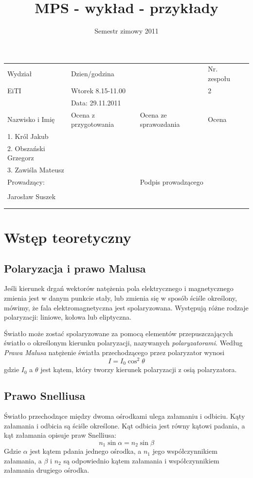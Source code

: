 \documentclass[10pt,a4paper]{article}
\begin{document}
\title{MPS - wykład - przykłady}
\date{Semestr zimowy 2011}
\begin{tabular}{|l|l|l|l|l|}
\hline
Wydział & \multicolumn{2}{l|}{Dzien/godzina}& Nr. zespołu\\
EiTI & \multicolumn{2}{l|}{Wtorek 8.15-11.00}& 2\\
\cline{2-3}
& \multicolumn{2}{l|}{Data: 29.11.2011}& \\
\hline
Nazwisko i Imię & Ocena z przygotowania & Ocena ze sprawozdania & Ocena\\
\hline
1. Król Jakub & & & \\
2. Obszański Grzegorz & & & \\
3. Zawiśla Mateusz & & & \\
\hline
\multicolumn{2}{|l|}{Prowadzący:} & \multicolumn{2}{l|}{Podpis prowadzącego}\\
\multicolumn{2}{|l|}{} & \multicolumn{2}{l|}{}\\
\multicolumn{2}{|l|}{Jarosław Suszek} & \multicolumn{2}{l|}{}\\
\multicolumn{2}{|l|}{} & \multicolumn{2}{l|}{}\\
\multicolumn{2}{|l|}{} & \multicolumn{2}{l|}{}\\\hline
 \end{tabular}
 \vspace{3cm}
\section{Wstęp teoretyczny}
\subsection{Polaryzacja i prawo Malusa}
Jeśli kierunek drgań wektorów natężenia pola elektrycznego i magnetycznego zmienia jest w danym punkcie stały, lub zmienia się w sposób ściśle określony, mówimy, że fala elektromagnetyczna jest spolaryzowana. 
Występują różne rodzaje polaryzacji: liniowe, kołowa lub eliptyczna.

Światło może zostać spolaryzowane za pomocą elementów przepuszczających światło o określonym kierunku polaryzacji, nazywanych \emph{polaryzatorami}. 
Według \emph{Prawa Malusa} natężenie światła przechodzącego przez polaryzator wynosi
\begin{equation}
I = I_0\cos^2{\theta}
\end{equation} 
gdzie $I_0$ a $\theta$ jest kątem, który tworzy kierunek polaryzacji z osią polaryzatora.

\subsection{Prawo Snelliusa}
Światło przechodzące między dwoma ośrodkami ulega załamaniu i odbiciu. Kąty załamania i odbicia są ściśle określone. Kąt odbicia jest równy kątowi padania, a kąt załamania opisuje praw Snelliusa:
\begin{equation}
n_1\sin\alpha = n_2\sin\beta
\end{equation} 
Gdzie $\alpha$ jest kątem pdania jednego ośrodka, a $n_1$ jego współczynnikiem załamania, a $\beta$ i $n_2$ są odpowiednio kątem załamania i współczynnikiem załamania drugiego ośrodka.
\end{document}
